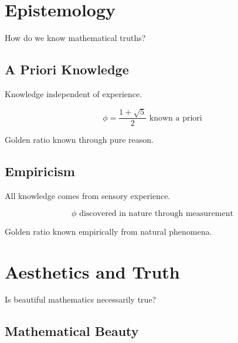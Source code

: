 \section{Epistemology}

How do we know mathematical truths?

\subsection{A Priori Knowledge}

\begin{definition}[A Priori]
\label{def:apriori}
Knowledge independent of experience.
\end{definition}

\begin{theorem}
\label{thm:apriori-golden}
\begin{equation}
\phi = \frac{1+\sqrt{5}}{2} \text{ known a priori}
\end{equation}

Golden ratio known through pure reason.
\end{theorem}

\subsection{Empiricism}

\begin{definition}[Empiricism]
\label{def:empiricism}
All knowledge comes from sensory experience.
\end{definition}

\begin{proposition}
\label{prop:empirical-golden}
\begin{equation}
\phi \text{ discovered in nature through measurement}
\end{equation}

Golden ratio known empirically from natural phenomena.
\end{proposition}

\section{Aesthetics and Truth}

Is beautiful mathematics necessarily true?

\subsection{Mathematical Beauty}

